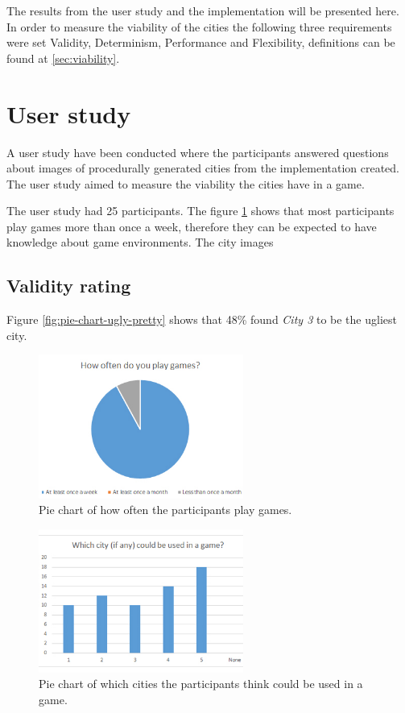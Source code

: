 
	The results from the user study and the implementation will be presented here. In order to measure the viability of the cities the following three requirements were set Validity, Determinism, Performance and Flexibility, definitions can be found at \ref{sec:viability}.
	
	\section{User study}
	A user study have been conducted where the participants answered questions about images of procedurally generated cities from the implementation created. The user study aimed to measure the viability the cities have in a game.
	
	The user study had 25 participants. The figure \ref{fig:pie-chart-often-play} shows that most participants play games more than once a week, therefore they can be expected to have knowledge about game environments. The city images
	
	\subsection{Validity rating}
		Figure \ref{fig:pie-chart-ugly-pretty} shows that 48\% found \textit{City 3} to be the ugliest city.
	
	\begin{figure}[h]
		\centering
		\includegraphics[width=0.6\textwidth]{"Images/OftenPlay"}
		\caption{Pie chart of how often the participants play games.}
		\label{fig:pie-chart-often-play}
	\end{figure}

	\begin{figure}[h]
		\centering
		\includegraphics[width=0.6\textwidth]{"Images/UseInGame"}
		\caption{Pie chart of which cities the participants think could be used in a game.}
		\label{fig:pie-chart-use-in-game}
	\end{figure}

